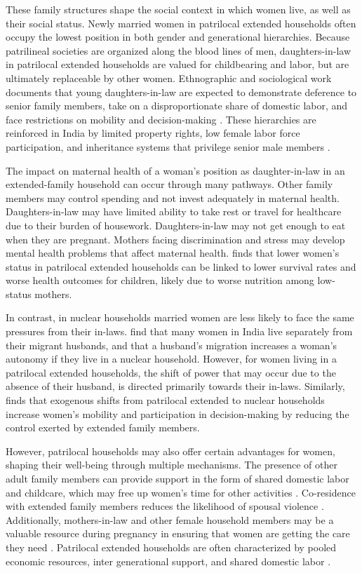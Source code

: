 \documentclass[10pt,twoside,reqno]{article}
\begin{document}
These family structures shape the social context in which women live, as well as their social status. Newly married women in patrilocal extended households often occupy the lowest position in both gender and generational hierarchies. Because patrilineal societies are organized along the blood lines of men, daughters-in-law in patrilocal extended households are valued for childbearing and labor, but are ultimately replaceable by other women. Ethnographic and sociological work documents that young daughters-in-law are expected to demonstrate deference to senior family members, take on a disproportionate share of domestic labor, and face restrictions on mobility and decision-making \citep{mandelbaum1988women, jeffery1989labour}. These hierarchies are reinforced in India by limited property rights, low female labor force participation, and inheritance systems that privilege senior male members \citep{jayachandran2015roots}. 

The impact on maternal health of a woman's position as daughter-in-law in an extended-family household can occur through many pathways. Other family members may control spending and not invest adequately in maternal health. Daughters-in-law may have limited ability to take rest or travel for healthcare due to their burden of housework. Daughters-in-law may not get enough to eat when they are pregnant. Mothers facing discrimination and stress may develop mental health problems that affect maternal health. \cite{coffey2022mothers} finds that lower women’s status in patrilocal extended households can be linked to lower survival rates and worse health outcomes for children, likely due to worse nutrition among low-status mothers.

In contrast, in nuclear households married women are less likely to face the same pressures from their in-laws. \cite{desai2008negotiated} find that many women in India live separately from their migrant husbands, and that a husband's migration increases a woman's autonomy if they live in a nuclear household. However, for women living in a patrilocal extended households, the shift of power that may occur due to the absence of their husband, is directed primarily towards their in-laws. Similarly, \cite{mookerjee2019gender} finds that exogenous shifts from patrilocal extended to nuclear households increase women’s mobility and participation in decision-making by reducing the control exerted by extended family members.

However, patrilocal households may also offer certain advantages for women, shaping their well-being through multiple mechanisms.  The presence of other adult family members can provide support in the form of shared domestic labor and childcare, which may free up women’s time for other activities \citep{khanna2024role}. Co-residence with extended family members reduces the likelihood of spousal violence \citep{khanna2024role}. Additionally, mothers-in-law and other female household members may be a valuable resource during pregnancy in ensuring that women are getting the care they need \citep{varghese2019coresidence}.  Patrilocal extended households are often characterized by pooled economic resources, inter generational support, and shared domestic labor \citep{wadley1988karimpur}.  
\end{document}

